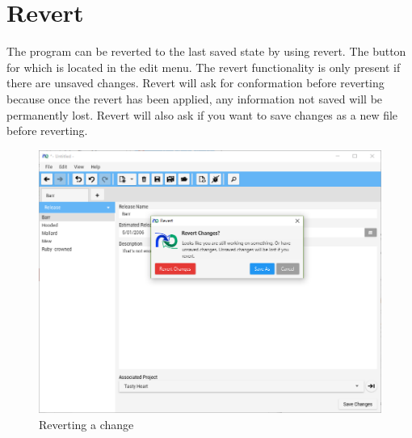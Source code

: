 \section{Revert}

The program can be reverted to the last saved state by using revert. The button for which is located in the edit menu.
The revert functionality is only present if there are unsaved changes.
Revert will ask for conformation before reverting because once the revert has been applied, any information not saved will be permanently lost.
Revert will also ask if you want to save changes as a new file before reverting.
\newline\newline


\begin{figure}[H]
\centering
\includegraphics[width=\textwidth]{images/screenshots/revert1.PNG}
\caption{Reverting a change}
\label{fig:revert}
\end{figure}